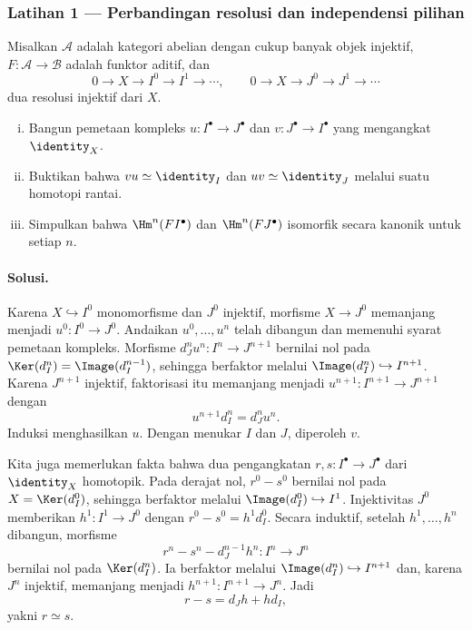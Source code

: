\subsubsection*{Latihan 1 --- Perbandingan resolusi dan independensi pilihan}
\hypertarget{o014.mastery.derived-spectral.002.ex01}{ }
\label{mastery:derived-spectral-002-ex01}

Misalkan $\mathcal{A}$ adalah kategori abelian dengan cukup banyak objek injektif,
$F:\mathcal{A}\to\mathcal{B}$ adalah funktor aditif, dan
\[
	0\to X\to I^0\to I^1\to\cdots,
	\qquad
	0\to X\to J^0\to J^1\to\cdots
\]
dua resolusi injektif dari $X$.
\begin{enumerate}[(i)]
	\item Bangun pemetaan kompleks $u:I^\bullet\to J^\bullet$ dan
	$v:J^\bullet\to I^\bullet$ yang mengangkat $\identity_X$.
	\item Buktikan bahwa $vu\simeq\identity_I$ dan
	$uv\simeq\identity_J$ melalui suatu homotopi rantai.
	\item Simpulkan bahwa $\Hm^n(FI^\bullet)$ dan
	$\Hm^n(FJ^\bullet)$ isomorfik secara kanonik untuk setiap $n$.
\end{enumerate}

\paragraph{Solusi.}
\hypertarget{o014.mastery.derived-spectral.002.sol01}{ }
Karena $X\hookrightarrow I^0$ monomorfisme dan $J^0$ injektif, morfisme
$X\to J^0$ memanjang menjadi $u^0:I^0\to J^0$. Andaikan
$u^0,\ldots,u^n$ telah dibangun dan memenuhi syarat pemetaan kompleks.
Morfisme $d_J^nu^n:I^n\to J^{n+1}$ bernilai nol pada
$\Ker(d_I^n)=\Image(d_I^{n-1})$, sehingga berfaktor melalui
$\Image(d_I^n)\hookrightarrow I^{n+1}$. Karena $J^{n+1}$ injektif,
faktorisasi itu memanjang menjadi $u^{n+1}:I^{n+1}\to J^{n+1}$ dengan
\[
	u^{n+1}d_I^n=d_J^nu^n.
\]
Induksi menghasilkan $u$. Dengan menukar $I$ dan $J$, diperoleh $v$.

Kita juga memerlukan fakta bahwa dua pengangkatan $r,s:I^\bullet\to
J^\bullet$ dari $\identity_X$ homotopik. Pada derajat nol, $r^0-s^0$
bernilai nol pada $X=\Ker(d_I^0)$, sehingga berfaktor melalui
$\Image(d_I^0)\hookrightarrow I^1$. Injektivitas $J^0$ memberikan
$h^1:I^1\to J^0$ dengan
$r^0-s^0=h^1d_I^0$. Secara induktif, setelah $h^1,\ldots,h^n$ dibangun,
morfisme
\[
	r^n-s^n-d_J^{n-1}h^n:I^n\longrightarrow J^n
\]
bernilai nol pada $\Ker(d_I^n)$. Ia berfaktor melalui
$\Image(d_I^n)\hookrightarrow I^{n+1}$ dan, karena $J^n$ injektif,
memanjang menjadi $h^{n+1}:I^{n+1}\to J^n$. Jadi
\[
	r-s=d_Jh+hd_I,
\]
yakni $r\simeq s$.

